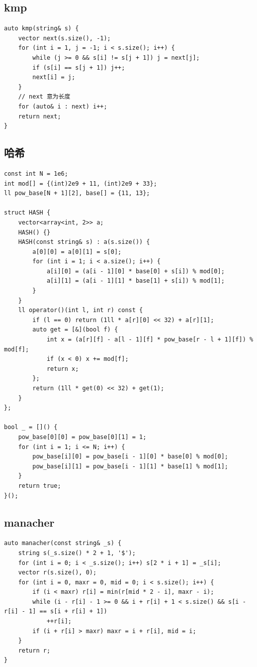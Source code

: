 \documentclass[UTF8, twoside]{ctexart}
\begin{document}
\begin{sloppypar}
\subsection{kmp}

\begin{lstlisting}[style=cpp]
auto kmp(string& s) {
    vector next(s.size(), -1);
    for (int i = 1, j = -1; i < s.size(); i++) {
        while (j >= 0 && s[i] != s[j + 1]) j = next[j];
        if (s[i] == s[j + 1]) j++;
        next[i] = j;
    }
    // next 意为长度
    for (auto& i : next) i++;
    return next;
}
\end{lstlisting}

\subsection{哈希}

\begin{lstlisting}[style=cpp]
const int N = 1e6;
int mod[] = {(int)2e9 + 11, (int)2e9 + 33};
ll pow_base[N + 1][2], base[] = {11, 13};

struct HASH {
    vector<array<int, 2>> a;
    HASH() {}
    HASH(const string& s) : a(s.size()) {
        a[0][0] = a[0][1] = s[0];
        for (int i = 1; i < a.size(); i++) {
            a[i][0] = (a[i - 1][0] * base[0] + s[i]) % mod[0];
            a[i][1] = (a[i - 1][1] * base[1] + s[i]) % mod[1];
        }
    }
    ll operator()(int l, int r) const {
        if (l == 0) return (1ll * a[r][0] << 32) + a[r][1];
        auto get = [&](bool f) {
            int x = (a[r][f] - a[l - 1][f] * pow_base[r - l + 1][f]) % mod[f];
            if (x < 0) x += mod[f];
            return x;
        };
        return (1ll * get(0) << 32) + get(1);
    }
};

bool _ = []() {
    pow_base[0][0] = pow_base[0][1] = 1;
    for (int i = 1; i <= N; i++) {
        pow_base[i][0] = pow_base[i - 1][0] * base[0] % mod[0];
        pow_base[i][1] = pow_base[i - 1][1] * base[1] % mod[1];
    }
    return true;
}();
\end{lstlisting}

\subsection{manacher}

\begin{lstlisting}[style=cpp]
auto manacher(const string& _s) {
    string s(_s.size() * 2 + 1, '$');
    for (int i = 0; i < _s.size(); i++) s[2 * i + 1] = _s[i];
    vector r(s.size(), 0);
    for (int i = 0, maxr = 0, mid = 0; i < s.size(); i++) {
        if (i < maxr) r[i] = min(r[mid * 2 - i], maxr - i);
        while (i - r[i] - 1 >= 0 && i + r[i] + 1 < s.size() && s[i - r[i] - 1] == s[i + r[i] + 1])
            ++r[i];
        if (i + r[i] > maxr) maxr = i + r[i], mid = i;
    }
    return r;
}
\end{lstlisting}


\end{sloppypar}
\end{document}
